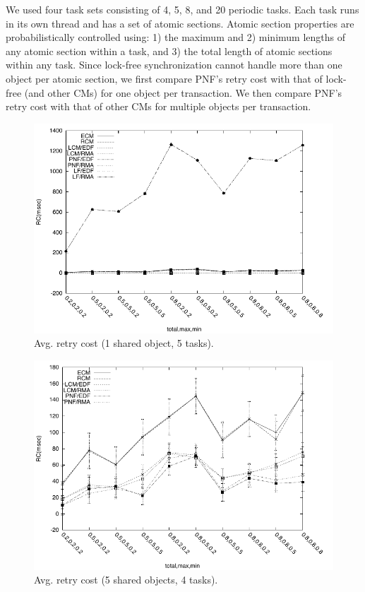 \documentclass[twocolumn]{article}
\begin{document}
We used four task sets consisting of 4, 5, 8, and 20 periodic tasks. Each task runs in its own thread and has a set of atomic sections. Atomic section properties are probabilistically controlled using: 1) the maximum and 2) minimum lengths of any atomic section within a task, and 3) the total length of atomic sections within any task. Since lock-free synchronization cannot handle more than one object per atomic section, we first compare PNF's retry cost with that of lock-free (and other CMs) for one object per transaction. We then compare PNF's retry cost with that of other CMs for multiple objects per transaction.

\begin{figure}[h]
\centering
\includegraphics[scale=0.7]{figures/Abr_dur_5t_1obj_1wr}
\caption{Avg. retry cost (1 shared object, 5 tasks).}
\label{fig:pnf_results_uniobject}
\end{figure}

\begin{figure}[h]
\centering
\includegraphics[scale=0.7]{figures/Abr_dur_4t_5obj_1wr}
\caption{Avg. retry cost (5 shared objects, 4 tasks).}
\label{fig-RC-pnf-4t}
\end{figure}
\end{document}
